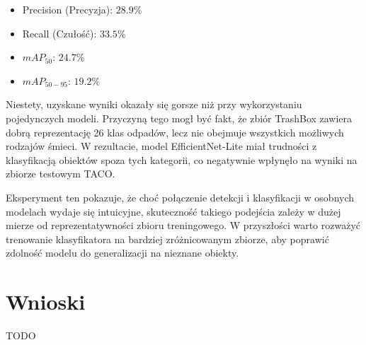 \documentclass[licencjacka]{pracamgr}
\begin{document}
\begin{itemize}
    \item Precision (Precyzja): $28.9\%$
    \item Recall (Czułość): $33.5\%$
    \item $mAP_{50}$: $24.7\%$
    \item $mAP_{50-95}$: $19.2\%$
\end{itemize}

Niestety, uzyskane wyniki okazały się gorsze niż przy wykorzystaniu pojedynczych modeli. Przyczyną tego mogł być fakt, że zbiór TrashBox zawiera dobrą reprezentację 26 klas odpadów, lecz nie obejmuje wszystkich możliwych rodzajów śmieci. W rezultacie, model EfficientNet-Lite miał trudności z klasyfikacją obiektów spoza tych kategorii, co negatywnie wpłynęło na wyniki na zbiorze testowym TACO.  

Eksperyment ten pokazuje, że choć połączenie detekcji i klasyfikacji w osobnych modelach wydaje się intuicyjne, skuteczność takiego podejścia zależy w dużej mierze od reprezentatywności zbioru treningowego. W przyszłości warto rozważyć trenowanie klasyfikatora na bardziej zróżnicowanym zbiorze, aby poprawić zdolność modelu do generalizacji na nieznane obiekty.

\section{Wnioski}
TODO
\end{document}
